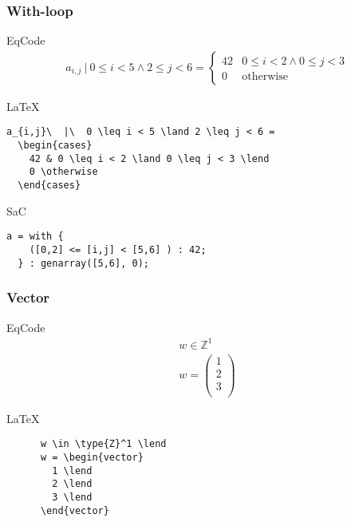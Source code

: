 \documentclass[xcolor=dvipsnames,mathserif,professionalfont,12pt]{beamer}
\begin{document}
\begin{frame}[fragile]
  \frametitle{With-loop}
    \begin{block}{EqCode}
      \begin{align*}
a_{i,j}\  |\  0 \leq i < 5 \land 2 \leq j < 6 =
\begin{cases}
42 & 0 \leq i < 2 \land 0 \leq j < 3 \\
0 & \text{otherwise}
\end{cases}
      \end{align*}
    \end{block}
      \begin{block}{\LaTeX}
      \begin{lstlisting}
a_{i,j}\  |\  0 \leq i < 5 \land 2 \leq j < 6 = 
  \begin{cases}
    42 & 0 \leq i < 2 \land 0 \leq j < 3 \lend
    0 \otherwise
  \end{cases}
      \end{lstlisting}
      \end{block}
      \begin{block}{SaC}
      \begin{lstlisting}
a = with {
    ([0,2] <= [i,j] < [5,6] ) : 42;
  } : genarray([5,6], 0);
      \end{lstlisting}
      \end{block}
\end{frame}

\begin{frame}[fragile]
  \frametitle{Vector}
    \begin{block}{EqCode}
      \begin{align*}
      w \in \mathbb{Z}^1 \\
      w = \left(
        \begin{array}{c}
        1 \\
        2 \\
        3 \\
      \end{array}
      \right)
      \end{align*}
    \end{block}
      \begin{block}{\LaTeX}
      \begin{lstlisting}
      w \in \type{Z}^1 \lend
      w = \begin{vector}
        1 \lend
        2 \lend
        3 \lend
      \end{vector}
      \end{lstlisting}
      \end{block}
\end{frame}
\end{document}
